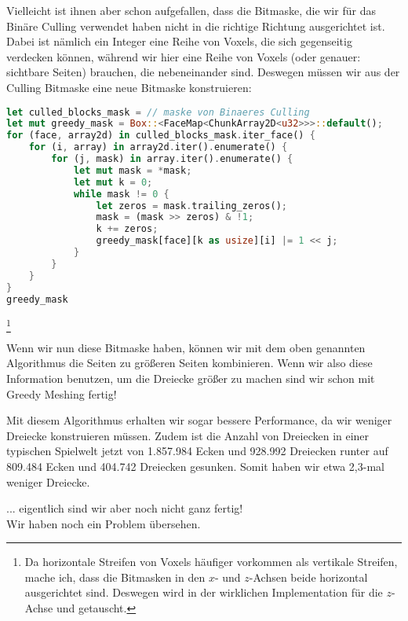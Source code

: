 Vielleicht ist ihnen aber schon aufgefallen,
dass die Bitmaske, die wir für das Binäre Culling
verwendet haben nicht in die richtige Richtung
ausgerichtet ist.
Dabei ist nämlich ein Integer eine Reihe von Voxels,
die sich gegenseitig verdecken können, während wir
hier eine Reihe von Voxels
(oder genauer: sichtbare Seiten)
brauchen, die nebeneinander sind.
Deswegen müssen wir aus der Culling Bitmaske
eine neue Bitmaske konstruieren:

\begin{lstlisting}[language=Rust]
let culled_blocks_mask = // maske von Binaeres Culling
let mut greedy_mask = Box::<FaceMap<ChunkArray2D<u32>>>::default();
for (face, array2d) in culled_blocks_mask.iter_face() {
	for (i, array) in array2d.iter().enumerate() {
		for (j, mask) in array.iter().enumerate() {
			let mut mask = *mask;
			let mut k = 0;
			while mask != 0 {
				let zeros = mask.trailing_zeros();
				mask = (mask >> zeros) & !1;
				k += zeros;
				greedy_mask[face][k as usize][i] |= 1 << j;
			}
		}
	}
}
greedy_mask
\end{lstlisting}
\footnote{
	Da horizontale Streifen von Voxels häufiger
	vorkommen als vertikale Streifen, mache ich,
	dass die Bitmasken in den $x$- und $z$-Achsen
	beide horizontal ausgerichtet sind.
	Deswegen wird in der wirklichen Implementation
	für die $z$-Achse  und  getauscht.
}

Wenn wir nun diese Bitmaske haben, können wir mit dem
oben genannten Algorithmus die Seiten zu größeren
Seiten kombinieren.
Wenn wir also diese Information benutzen,
um die Dreiecke größer zu machen sind wir
schon mit Greedy Meshing fertig!

\vspace{0.5cm}


Mit diesem Algorithmus erhalten wir sogar bessere
Performance, da wir weniger Dreiecke konstruieren
müssen.
Zudem ist die Anzahl von Dreiecken in einer
typischen Spielwelt jetzt von
1.857.984 Ecken und 928.992 Dreiecken
runter auf 809.484 Ecken und 404.742 Dreiecken
gesunken.
Somit haben wir etwa 2,3-mal weniger Dreiecke.

\vspace{0.7cm}

{
	\setlength{\parindent}{0pt}
	... eigentlich sind wir aber noch nicht ganz fertig!\\
	Wir haben noch ein Problem übersehen.
}
